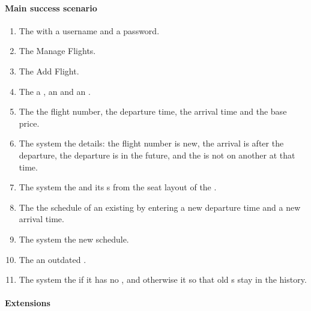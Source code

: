 \paragraph{Main success scenario}

\begin{enumerate}
\item The   with a username and a password.
\item The   Manage Flights.
\item The   Add Flight.
\item The   a , an  and an
  .
\item The   the flight number, the departure time,
  the arrival time and the base price.
\item The system  the details: the flight number is new, the
  arrival is after the departure, the departure is in the future, and the
   is not on another  at that time.
\item The system  the  and  its s
  from the seat layout of the .
\item The   the schedule of an existing
   by entering a new departure time and a new arrival time.
\item The system  the new schedule.
\item The   an outdated .
\item The system  the  if it has no ,
  and otherwise  it so that old s stay in the
  history.
\end{enumerate}

\paragraph{Extensions}

